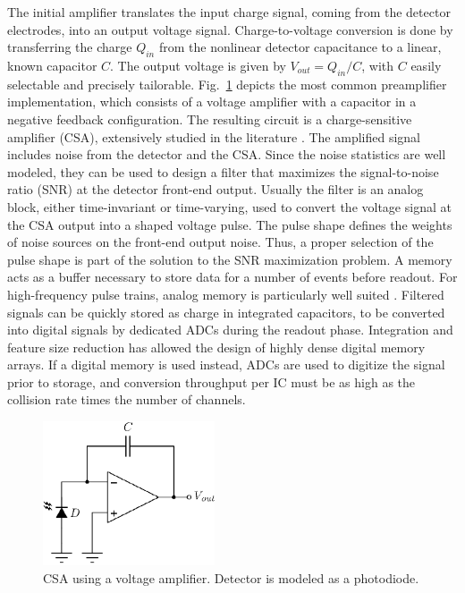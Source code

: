 The initial amplifier translates the input charge signal, coming from the detector electrodes, into an output voltage signal. Charge-to-voltage conversion is done by transferring the charge $Q_{in}$ from the nonlinear detector capacitance to a linear, known capacitor $C$. The output voltage is given by $V_{out} = Q_{in}/C$, with $C$ easily selectable and precisely tailorable. Fig.~\ref{fig:csa_post} depicts the most common preamplifier implementation, which consists of a voltage amplifier with a capacitor in a negative feedback configuration. The resulting circuit is a charge-sensitive amplifier (CSA), extensively studied in the literature \citep{Snoeys100,Asp100,deGeronimo500,oconnor100,Alvarez101}. The amplified signal includes noise from the detector and the CSA. Since the noise statistics are well modeled, they can be used to design a filter that maximizes the signal-to-noise ratio (SNR) at the detector front-end output. Usually the filter is an analog block, either time-invariant or time-varying, used to convert the voltage signal at the CSA output into a shaped voltage pulse. The pulse shape defines the weights of noise sources on the front-end output noise. Thus, a proper selection of the pulse shape is part of the solution to the SNR maximization problem. A memory acts as a buffer necessary to store data for a number of events before readout. For high-frequency pulse trains, analog memory is particularly well suited \citep{Kleinfelder100,Haller100}. Filtered signals can be quickly stored as charge in integrated capacitors, to be converted into digital signals by dedicated ADCs during the readout phase. Integration and feature size reduction has allowed the design of highly dense digital memory arrays. If a digital memory is used instead, ADCs are used to digitize the signal prior to storage, and conversion throughput per IC must be as high as the collision rate times the number of channels. 

\begin{figure}[!t]
	\centering
	\includegraphics[width=2in]{./Figures/csa_post}
	\caption{CSA using a voltage amplifier. Detector is modeled as a photodiode.}\label{fig:csa_post}
\end{figure}


